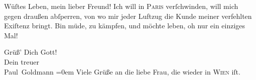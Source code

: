 \pstart
           Wüſtes Leben, mein lieber Freund! Ich will in \textsc{Paris} verſchwinden, will mich gegen draußen abſperren, von wo mir jeder Luftzug die
               Kunde meiner {\pb}verfehlten Exiſtenz bringt. Bin müde,
               zu kämpfen, und möchte leben, oh nur ein einziges Mal!\pend
           
\pstart
           Grüß’ Dich Gott! {\\[\baselineskip]}Dein treuer {\\[\baselineskip]}\spacefill\mbox{Paul Goldmann}\pend
           \leftskip=0em{}
\pstart
           \noindent{}Viele Grüße an die liebe Frau, die wieder in \textsc{Wien} iſt.\pend
           \endnumbering{}  \newcommand{\dateiname}{L02757}\newcommand{\titel}{Paul Goldmann an Arthur Schnitzler, 29. 11. [1895]}\newcommand{\editorInnen}{Martin Anton Müller und Laura Untner}
